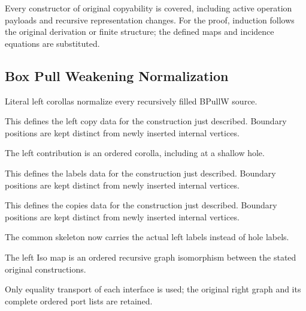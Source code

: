 Every constructor of original copyability is covered, including active operation payloads and recursive representation changes.
For the proof, induction follows the original derivation or finite structure; the defined maps and incidence equations are substituted.
\par{}

\subsection{Box Pull Weakening Normalization}
Literal left corollas normalize every recursively filled BPullW source.

This defines the left copy data for the construction just described. Boundary positions are kept distinct from newly inserted internal vertices.
\par{}

The left contribution is an ordered corolla, including at a shallow hole.
\par{}

This defines the labels data for the construction just described. Boundary positions are kept distinct from newly inserted internal vertices.
\par{}

This defines the copies data for the construction just described. Boundary positions are kept distinct from newly inserted internal vertices.
\par{}

The common skeleton now carries the actual left labels instead of hole labels.
\par{}

The left Iso map is an ordered recursive graph isomorphism between the stated original constructions.
\par{}

Only equality transport of each interface is used; the original right graph and its complete ordered port lists are retained.
\par{}

